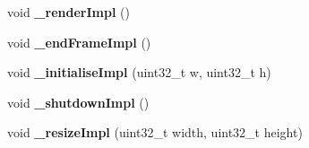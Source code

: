 \begin{DoxyCompactItemize}
\item 
\hypertarget{class_verdi_1_1_tex_slice_strategy_adb113b54741909ae942c3d39f97c61ff}{void {\bfseries \-\_\-render\-Impl} ()}\label{class_verdi_1_1_tex_slice_strategy_adb113b54741909ae942c3d39f97c61ff}

\item 
\hypertarget{class_verdi_1_1_tex_slice_strategy_af71a7fecb80b4ee82c485dc01bfdf6b2}{void {\bfseries \-\_\-end\-Frame\-Impl} ()}\label{class_verdi_1_1_tex_slice_strategy_af71a7fecb80b4ee82c485dc01bfdf6b2}

\item 
\hypertarget{class_verdi_1_1_tex_slice_strategy_af0a05b4e9063a43093b27987c9ead74c}{void {\bfseries \-\_\-initialise\-Impl} (uint32\-\_\-t w, uint32\-\_\-t h)}\label{class_verdi_1_1_tex_slice_strategy_af0a05b4e9063a43093b27987c9ead74c}

\item 
\hypertarget{class_verdi_1_1_tex_slice_strategy_a300bce13ac11abb9c74354fba0e117f3}{void {\bfseries \-\_\-shutdown\-Impl} ()}\label{class_verdi_1_1_tex_slice_strategy_a300bce13ac11abb9c74354fba0e117f3}

\item 
\hypertarget{class_verdi_1_1_tex_slice_strategy_a5bd86f046d011f3a15223f811c0d5e5a}{void {\bfseries \-\_\-resize\-Impl} (uint32\-\_\-t width, uint32\-\_\-t height)}\label{class_verdi_1_1_tex_slice_strategy_a5bd86f046d011f3a15223f811c0d5e5a}

\end{DoxyCompactItemize}
